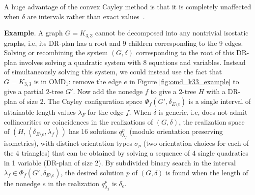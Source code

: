 \noindent
\note A huge advantage of the convex Cayley method is that it is
completely unaffected when $\delta$ are intervals rather than exact
values~\cite{GaoSitharam}.



\medskip\noindent
\textbf{Example}. 
A graph $G=K_{3,3}$  cannot be decomposed into any nontrivial
isostatic graphs, i.e, its DR-plan has a root and 9 children
corresponding to the 9 edges. Solving or recombining the system
$(G,\delta)$ corresponding to the root of this DR-plan involves
solving a quadratic system with 8 equations and variables. Instead of
simultaneously solving this system, we could instead use the fact that
$G=K_{3,3}$ is in OMD$_1$: remove the edge $e$ in Figure
\ref{fig:omd_k33_example} to give a partial 2-tree $G'$. Now add the
nonedge $f$ to give a 2-tree $H$ with a DR-plan of size 2. The Cayley
configuration space $\Phi_f(G', \delta_{E\setminus e})$ is a single
interval of attainable length values $\lambda_F$ for the edge $f$.
When $\delta$ is generic, i.e, does not admit collinearities or
coincidences in the realizations of $(G,\delta)$, the realization
space of $(H, \left<\delta_{E\setminus e}, \lambda_f\right>)$ has 16
solutions $q^p_{\lambda_f}$ (modulo orientation preserving
isometries), with distinct orientation types $\sigma_p$ (two
orientation choices for each of the 4 triangles) that can be obtained
by solving a sequence of 4 single quadratics in 1 variable (DR-plan of
size 2). By subdivided binary search in the interval $\lambda_f \in
\Phi_f(G', \delta_{E\setminus e})$, the desired solution $p$  of
$(G,\delta)$ is found when the length of the nonedge $e$ in  the
realization $q^p_{\lambda_f}$ is $\delta_e$.
%
